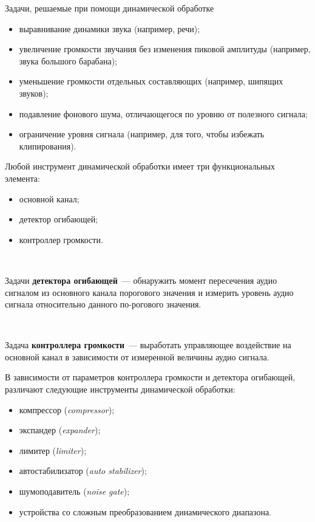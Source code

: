 \documentclass{beamer}
\begin{document}
\begin{frame}
  \begin{block}{Задачи, решаемые при помощи динамической обработке}
    \begin{itemize}
       \item выравнивание динамики звука (например, речи);
       \item увеличение громкости звучания без изменения пиковой амплитуды (например, звука большого барабана);
       \item уменьшение громкости отдельных составляющих (например, шипящих звуков);
       \item подавление фонового шума, отличающегося по уровню от полезного сигнала;
       \item ограничение уровня сигнала (например, для того, чтобы избежать клипирования).
    \end{itemize}
  \end{block}
\end{frame}

\begin{frame}
  Любой инструмент динамической обработки имеет три функциональных элемента:
  \begin{itemize}
    \item основной канал;
    \item детектор огибающей;
    \item контроллер громкости.
  \end{itemize}

  ~

  Задачи \textbf{детектора огибающей}~--- обнаружить момент пересечения аудио сигналом из основного канала порогового значения и измерить уровень аудио сигнала   относительно данного по-рогового значения.

  ~

  Задача \textbf{контроллера громкости}~--- выработать управляющее воздействие на основной канал в зависимости от измеренной величины аудио сигнала.
\end{frame}

\begin{frame}
  В зависимости от параметров контроллера громкости и детектора огибающей, различают следующие инструменты динамической обработки:
  \begin{itemize}
    \item компрессор (\textit{compressor});
    \item экспандер (\textit{expander});
    \item лимитер (\textit{limiter});
    \item автостабилизатор (\textit{auto stabilizer});
    \item шумоподавитель (\textit{noise gate});
    \item устройства со сложным преобразованием динамического диапазона.
  \end{itemize}
\end{frame}
\end{document}
